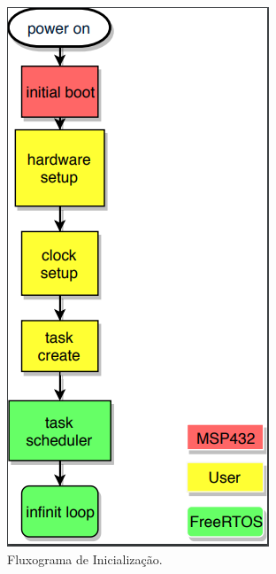 \begin{apendicesenv}
\begin{figure}[!h]
	\centerfloat
	\centering
	\includegraphics[keepaspectratio=true,scale=0.65]{figuras/flowChart_obc.PNG}
	\caption{Fluxograma de Inicialização.}
	\label{flowChart_obc}
\end{figure}


\end{apendicesenv}
